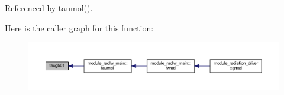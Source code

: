 Referenced by taumol().



Here is the caller graph for this function\+:
\nopagebreak
\begin{figure}[H]
\begin{center}
\leavevmode
\includegraphics[width=350pt]{group__module__radlw__main_ga001d1bcd17533f7f920f859ff9a4e60f_icgraph}
\end{center}
\end{figure}


